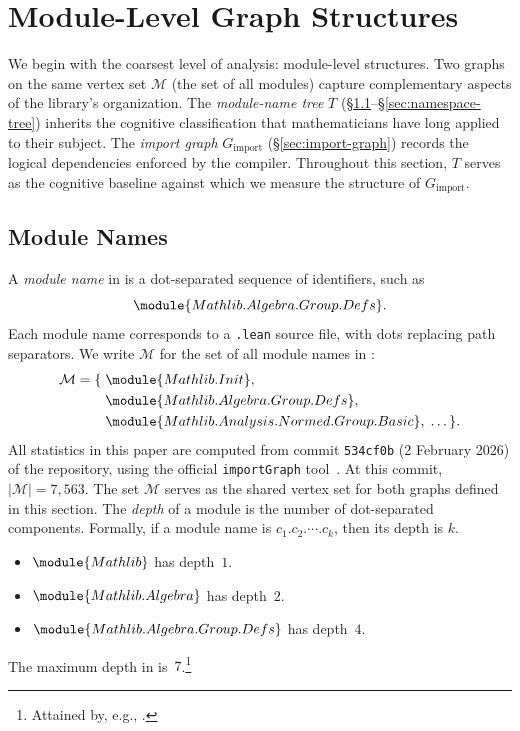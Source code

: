 \section{Module-Level Graph Structures}

We begin with the coarsest level of analysis: module-level structures. Two graphs on the same vertex set $\mathcal{M}$ (the set of all  modules) capture complementary aspects of the library's organization. The \emph{module-name tree} $T$ (\S\ref{sec:module-names}--\S\ref{sec:namespace-tree}) inherits the cognitive classification that mathematicians have long applied to their subject. The \emph{import graph} $G_{\mathrm{import}}$ (\S\ref{sec:import-graph}) records the logical dependencies enforced by the compiler. Throughout this section, $T$ serves as the cognitive baseline against which we measure the structure of $G_{\mathrm{import}}$.

\subsection{Module Names}
\label{sec:module-names}
A \emph{module name} in  is a dot-separated sequence of identifiers, such as
\[
  \module{Mathlib.Algebra.Group.Defs}.
\]
Each module name corresponds to a \texttt{.lean} source file, with dots replacing path separators. We write $\mathcal{M}$ for the set of all module names in :
\begin{align*}
  \mathcal{M} = \{\; &\module{Mathlib.Init},\\
    &\module{Mathlib.Algebra.Group.Defs},\\
    &\module{Mathlib.Analysis.Normed.Group.Basic},\; \ldots\,\}.
\end{align*}
All statistics in this paper are computed from commit \texttt{534cf0b} (2 February 2026) of the  repository, using the official \texttt{importGraph} tool~\cite{importgraph}. At this commit, $|\mathcal{M}| = 7{,}563$. The set $\mathcal{M}$ serves as the shared vertex set for both graphs defined in this section. The \emph{depth} of a module is the number of dot-separated components. Formally, if a module name is $c_1.c_2.\cdots.c_k$, then its depth is $k$.

\begin{example}
\leavevmode
\begin{itemize}
  \item $\module{Mathlib}$ has depth~$1$.
  \item $\module{Mathlib.Algebra}$ has depth~$2$.
  \item $\module{Mathlib.Algebra.Group.Defs}$ has depth~$4$.
\end{itemize}
The maximum depth in  is~$7$.\footnote{Attained by, e.g., .}
\end{example}

